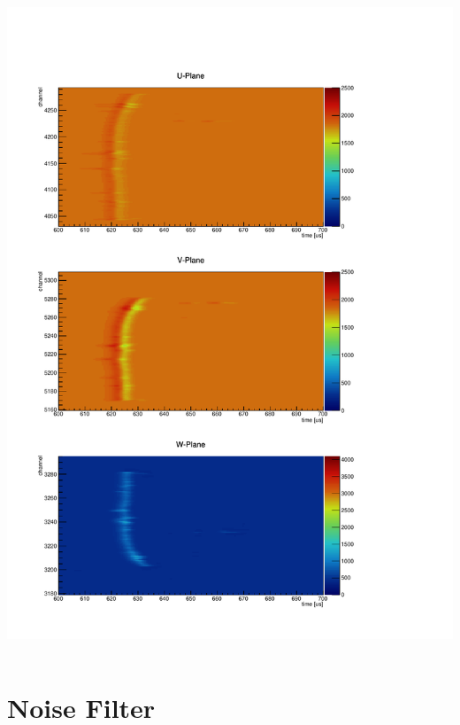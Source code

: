 \documentclass[xcolor=dvipsnames]{beamer}
\begin{document}
\begin{frame}
\begin{columns}
\begin{column}{0.5\textwidth}
      \includegraphics[width=\textwidth]{disp-pdsp-brookes-event.pdf}
    \end{column}
  \end{columns}
\end{frame}

\section{Noise Filter}
\end{document}

